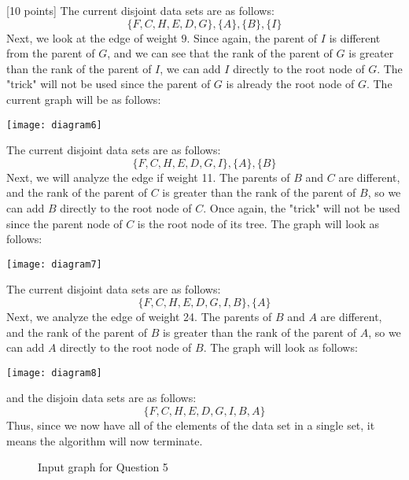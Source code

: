 \documentclass[12pt]{article}
\newcounter{ques}
\newenvironment{question}{\stepcounter{ques}{\noindent\bf Question \arabic{ques}:}}{\vspace{5mm}}
\begin{document}
\begin{question}[10 points]
The current disjoint data sets are as follows:
$$\{F,C,H,E,D,G\},\{A\},\{B\},\{I\}$$
Next, we look at the edge of weight $9$. Since again, the parent of $I$ is different from the parent of $G$, and we can see that the rank of the parent of $G$ is greater than the rank of the parent of $I$, we can add $I$ directly to the root node of $G$. The "trick" will not be used since the parent of $G$ is already the root node of $G$. The current graph will be as follows:
\begin{center}
\texttt{[image: diagram6]}
\end{center}
The current disjoint data sets are as follows:
$$\{F,C,H,E,D,G,I\},\{A\},\{B\}$$
Next, we will analyze the edge if weight 11. The parents of $B$ and $C$ are different, and the rank of the parent of $C$ is greater than the rank of the parent of $B$, so we can add $B$ directly to the root node of $C$. Once again, the "trick" will not be used since the parent node of $C$ is the root node of its tree. The graph will look as follows:
\begin{center}
\texttt{[image: diagram7]}
\end{center}
The current disjoint data sets are as follows:
$$\{F,C,H,E,D,G,I,B\},\{A\}$$
Next, we analyze the edge of weight 24. The parents of $B$ and $A$ are different, and the rank of the parent of $B$ is greater than the rank of the parent of $A$, so we can add $A$ directly to the root node of $B$. The graph will look as follows:
\begin{center}
\texttt{[image: diagram8]}
\end{center}
and the disjoin data sets are as follows:
$$\{F,C,H,E,D,G,I,B,A\}$$
Thus, since we now have all of the elements of the data set in a single set, it means the algorithm will now terminate.
\end{question}


	\begin{figure}
		\centerline{}
		\caption{Input graph for Question 5}
		\label{fig:MSTgraph}
	\end{figure}
\end{document}
